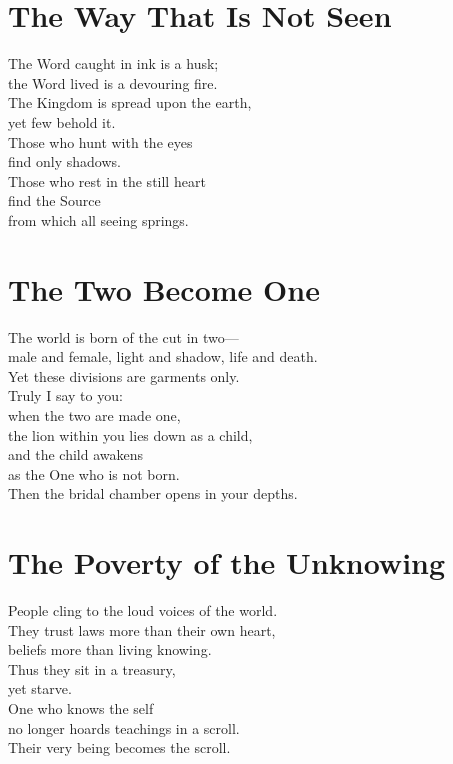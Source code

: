 \documentclass[10pt, openright]{book}
\begin{document}
\section{The Way That Is Not Seen}
The Word caught in ink is a husk; \\
the Word lived is a devouring fire. \\
The Kingdom is spread upon the earth, \\
yet few behold it. \\

Those who hunt with the eyes \\
find only shadows. \\
Those who rest in the still heart \\
find the Source \\
from which all seeing springs.

\section{The Two Become One}
The world is born of the cut in two— \\
male and female, light and shadow, life and death. \\
Yet these divisions are garments only. \\

Truly I say to you: \\
when the two are made one, \\
the lion within you lies down as a child, \\
and the child awakens \\
as the One who is not born. \\

Then the bridal chamber opens in your depths.

\section{The Poverty of the Unknowing}
People cling to the loud voices of the world. \\
They trust laws more than their own heart, \\
beliefs more than living knowing. \\
Thus they sit in a treasury, \\
yet starve. \\

One who knows the self \\
no longer hoards teachings in a scroll. \\
Their very being becomes the scroll.
\end{document}
